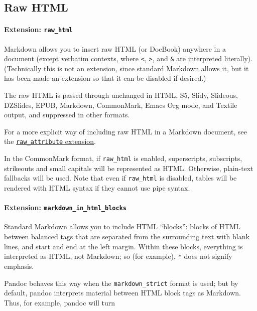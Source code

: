 \documentclass[]{article}
\begin{document}
\hypertarget{raw-html}{%
\subsection{Raw HTML}\label{raw-html}}

\hypertarget{extension-raw_html}{%
\paragraph{\texorpdfstring{Extension:
\texttt{raw\_html}}{Extension: raw\_html}}\label{extension-raw_html}}

Markdown allows you to insert raw HTML (or DocBook) anywhere in a
document (except verbatim contexts, where \texttt{\textless{}},
\texttt{\textgreater{}}, and \texttt{\&} are interpreted literally).
(Technically this is not an extension, since standard Markdown allows
it, but it has been made an extension so that it can be disabled if
desired.)

The raw HTML is passed through unchanged in HTML, S5, Slidy, Slideous,
DZSlides, EPUB, Markdown, CommonMark, Emacs Org mode, and Textile
output, and suppressed in other formats.

For a more explicit way of including raw HTML in a Markdown document,
see the
\protect\hyperlink{extension-raw_attribute}{\texttt{raw\_attribute}
extension}.

In the CommonMark format, if \texttt{raw\_html} is enabled,
superscripts, subscripts, strikeouts and small capitals will be
represented as HTML. Otherwise, plain-text fallbacks will be used. Note
that even if \texttt{raw\_html} is disabled, tables will be rendered
with HTML syntax if they cannot use pipe syntax.

\hypertarget{extension-markdown_in_html_blocks}{%
\paragraph{\texorpdfstring{Extension:
\texttt{markdown\_in\_html\_blocks}}{Extension: markdown\_in\_html\_blocks}}\label{extension-markdown_in_html_blocks}}

Standard Markdown allows you to include HTML ``blocks'': blocks of HTML
between balanced tags that are separated from the surrounding text with
blank lines, and start and end at the left margin. Within these blocks,
everything is interpreted as HTML, not Markdown; so (for example),
\texttt{*} does not signify emphasis.

Pandoc behaves this way when the \texttt{markdown\_strict} format is
used; but by default, pandoc interprets material between HTML block tags
as Markdown. Thus, for example, pandoc will turn
\end{document}
